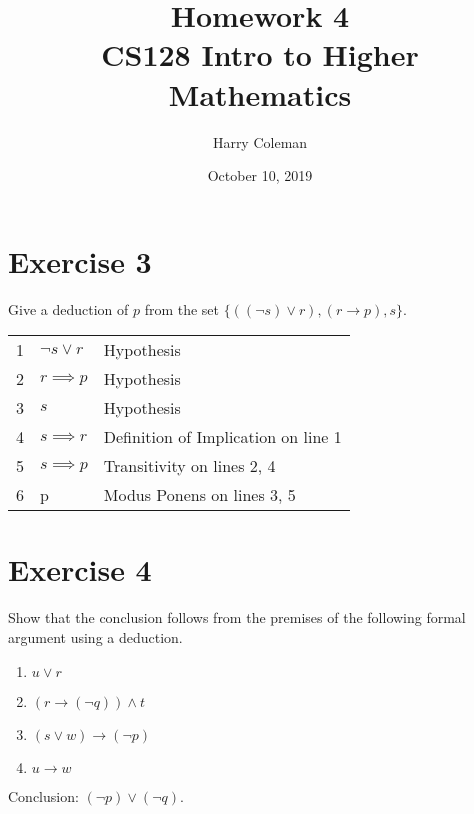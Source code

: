 \documentclass[12pt]{article}
\begin{document}
 
\title{Homework 4\\
    \large CS128 Intro to Higher Mathematics}
\author{Harry Coleman}
\date{October 10, 2019}

\maketitle

\section*{Exercise 3}
\begin{framed}
    Give a deduction of $p$ from the set $\{((\neg s) \lor r), (r \rightarrow p), s\}.$
\end{framed}

\begin{center}
    \begin{tabular}{r l l}
        1 & $\lnot s \lor r$ & Hypothesis \\
        2 & $r \implies p$ & Hypothesis \\
        3 & $s$ & Hypothesis \\
        \hline
        4 & $s \implies r$ & Definition of Implication on line 1 \\
        5 & $s \implies p$ & Transitivity on lines 2, 4 \\
        \hline
        6 & p & Modus Ponens on lines 3, 5
    \end{tabular}    
\end{center}

\newpage
\section*{Exercise 4}
\begin{framed}
    Show that the conclusion follows from the premises of the following formal argument using a deduction.

    \begin{enumerate}
    \item $u \lor r$
    \item $(r \rightarrow (\neg q)) \land t$
    \item $(s \lor w) \rightarrow (\neg p)$
    \item $u\rightarrow w$
    \end{enumerate}
    Conclusion: $(\neg p) \lor (\neg q)$.
\end{framed}
\end{document}
